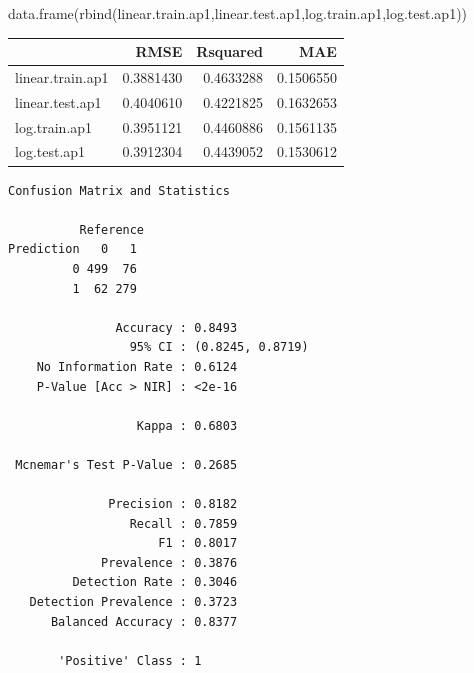 \documentclass[
  letterpaper,
  DIV=11,
  numbers=noendperiod]{scrartcl}
\newenvironment{Shaded}{\begin{snugshade}}{\end{snugshade}}
\newcommand{\AttributeTok}[1]{\textcolor[rgb]{0.40,0.45,0.13}{#1}}
\newcommand{\FunctionTok}[1]{\textcolor[rgb]{0.28,0.35,0.67}{#1}}
\newcommand{\NormalTok}[1]{\textcolor[rgb]{0.00,0.23,0.31}{#1}}
\newcommand{\OtherTok}[1]{\textcolor[rgb]{0.00,0.23,0.31}{#1}}
\newcommand{\SpecialCharTok}[1]{\textcolor[rgb]{0.37,0.37,0.37}{#1}}
\newcommand{\StringTok}[1]{\textcolor[rgb]{0.13,0.47,0.30}{#1}}
\begin{document}
\begin{Shaded}
\begin{Highlighting}[]
\FunctionTok{data.frame}\NormalTok{(}\FunctionTok{rbind}\NormalTok{(linear.train.ap1,linear.test.ap1,log.train.ap1,log.test.ap1))}
\end{Highlighting}
\end{Shaded}

\begin{longtable}[]{@{}lrrr@{}}
\toprule\noalign{}
& RMSE & Rsquared & MAE \\
\midrule\noalign{}
\endhead
\bottomrule\noalign{}
\endlastfoot
linear.train.ap1 & 0.3881430 & 0.4633288 & 0.1506550 \\
linear.test.ap1 & 0.4040610 & 0.4221825 & 0.1632653 \\
log.train.ap1 & 0.3951121 & 0.4460886 & 0.1561135 \\
log.test.ap1 & 0.3912304 & 0.4439052 & 0.1530612 \\
\end{longtable}

\begin{Shaded}
\end{Shaded}

\begin{verbatim}
Confusion Matrix and Statistics

          Reference
Prediction   0   1
         0 499  76
         1  62 279
                                          
               Accuracy : 0.8493          
                 95% CI : (0.8245, 0.8719)
    No Information Rate : 0.6124          
    P-Value [Acc > NIR] : <2e-16          
                                          
                  Kappa : 0.6803          
                                          
 Mcnemar's Test P-Value : 0.2685          
                                          
              Precision : 0.8182          
                 Recall : 0.7859          
                     F1 : 0.8017          
             Prevalence : 0.3876          
         Detection Rate : 0.3046          
   Detection Prevalence : 0.3723          
      Balanced Accuracy : 0.8377          
                                          
       'Positive' Class : 1               
                                          
\end{verbatim}
\end{document}
